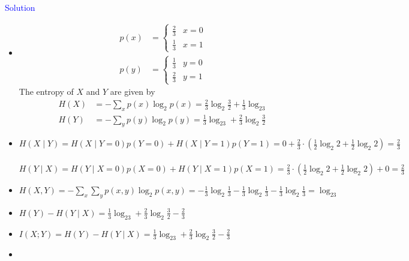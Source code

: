 \textcolor{blue}{Solution} \\
\begin{itemize}
    \item [(a)] 
    \begin{align*}
        p(x) &= \begin{cases}
            \frac{2}{3} & x=0 \\
            \frac{1}{3} & x=1
        \end{cases} \\
        p(y) &= \begin{cases}
            \frac{1}{3} & y=0 \\
            \frac{2}{3} & y=1
        \end{cases}
    \end{align*}
    The entropy of $X$ and $Y$ are given by
    \begin{align*}
        H(X) &= -\sum_{x} p(x) \log_2 p(x) = \frac{2}{3}\log_2\frac{3}{2} + \frac{1}{3}\log_23 \\
        H(Y) &= -\sum_{y} p(y) \log_2 p(y) = \frac{1}{3}\log_23 + \frac{2}{3}\log_2\frac{3}{2}
    \end{align*}

    \item [(b)]
    $H(X \mid Y) = H(X \mid Y=0)p(Y=0) + H(X \mid Y=1)p(Y=1) = 0 + \frac{2}{3} \cdot (\frac{1}{2}\log_2 2 + \frac{1}{2}\log_2 2) = \frac{2}{3}$ \\
    \\
    $H(Y \mid X) = H(Y \mid X=0)p(X=0) + H(Y \mid X=1)p(X=1) = \frac{2}{3} \cdot (\frac{1}{2}\log_2 2 + \frac{1}{2}\log_2 2) + 0 = \frac{2}{3}$\\

    \item [(c)]
    $H(X, Y) = -\sum_{x}\sum_{y} p(x, y) \log_2 p(x, y) = -\frac{1}{3}\log_2\frac{1}{3} - \frac{1}{3}\log_2\frac{1}{3} - \frac{1}{3}\log_2\frac{1}{3} = \log_23$

    \item [(d)]
    $H(Y)-H(Y \mid X) = \frac{1}{3}\log_23 + \frac{2}{3}\log_2\frac{3}{2} - \frac{2}{3}$

    \item [(e)]
    $I(X ; Y) = H(Y) - H(Y \mid X) = \frac{1}{3}\log_23 + \frac{2}{3}\log_2\frac{3}{2} - \frac{2}{3}$

    \item [(f)]
    \begin{figure}[H]
        \centering
\end{figure}
\end{itemize}
